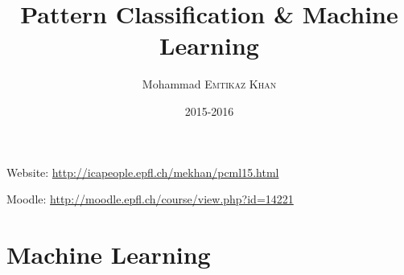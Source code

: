 

\title{Pattern Classification \& Machine Learning}
\author{Mohammad \textsc{Emtikaz Khan}}
\date{2015-2016}


\maketitle
\tableofcontents

\newpage

Website: \url{http://icapeople.epfl.ch/mekhan/pcml15.html}

Moodle: \url{http://moodle.epfl.ch/course/view.php?id=14221}

\chapter{Machine Learning}
    



\nocite{*}







